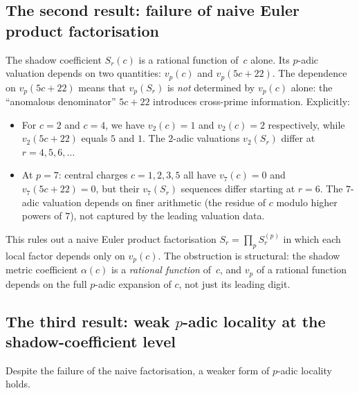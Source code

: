 \documentclass[11pt]{article}
\begin{document}
\subsection*{The second result: failure of naive Euler product
factorisation}

The shadow coefficient $S_r(c)$ is a rational function of~$c$
alone.  Its $p$-adic valuation depends on two quantities:
$v_p(c)$ and $v_p(5c+22)$.  The dependence on $v_p(5c+22)$ means
that $v_p(S_r)$ is \emph{not} determined by $v_p(c)$ alone: the
``anomalous denominator'' $5c+22$ introduces cross-prime
information.  Explicitly:
\begin{itemize}[leftmargin=1.8em]
\item For $c = 2$ and $c = 4$, we have $v_2(c) = 1$ and
  $v_2(c) = 2$ respectively, while $v_2(5c+22)$ equals $5$ and $1$.
  The $2$-adic valuations $v_2(S_r)$ differ at $r = 4, 5, 6,
  \ldots$

\item At $p = 7$: central charges $c = 1, 2, 3, 5$ all have
  $v_7(c) = 0$ and $v_7(5c+22) = 0$, but their $v_7(S_r)$
  sequences differ starting at $r = 6$.  The $7$-adic valuation
  depends on finer arithmetic (the residue of $c$ modulo higher
  powers of $7$), not captured by the leading valuation data.
\end{itemize}

This rules out a naive Euler product factorisation
$S_r = \prod_p S_r^{(p)}$ in which each local factor depends
only on $v_p(c)$.  The obstruction is structural: the shadow
metric coefficient $\alpha(c)$ is a \emph{rational function}
of~$c$, and $v_p$ of a rational function depends on the full
$p$-adic expansion of $c$, not just its leading digit.

\subsection*{The third result: weak $p$-adic locality at the
shadow-coefficient level}

Despite the failure of the naive factorisation, a weaker form
of $p$-adic locality holds.
\end{document}
